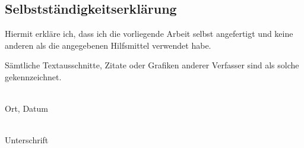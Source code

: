 
\begin{center}
    \section*{Selbstständigkeitserklärung}
\end{center}

    \vspace{2cm}

    Hiermit erkläre ich, dass ich die vorliegende 
    Arbeit selbst angefertigt und keine anderen 
    als die angegebenen Hilfsmittel verwendet habe.
    
    Sämtliche Textausschnitte, Zitate oder Grafiken 
    anderer Verfasser sind als solche gekennzeichnet.
    

    \vspace{5\baselineskip}
    \begin{minipage}{0.4\textwidth}
        \parbox{0.8\linewidth}{\dotfill}\\
        Ort, Datum
    \end{minipage}
    \begin{minipage}{0.2\textwidth}
        \hfill
    \end{minipage}
    \begin{minipage}{0.4\textwidth}
        \parbox{0.8\linewidth}{\dotfill}\\
        Unterschrift    
    \end{minipage}

